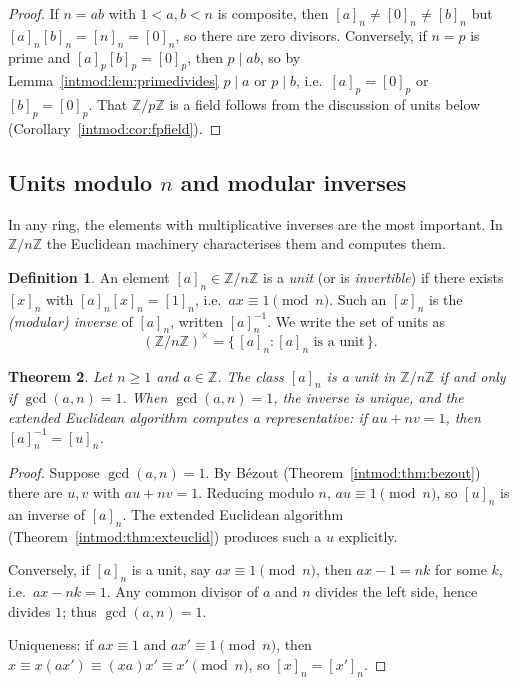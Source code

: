 \documentclass[11pt,a4paper]{article}
\newtheorem{theorem}{Theorem}[section]
\theoremstyle{definition}
\newtheorem{definition}[theorem]{Definition}
\theoremstyle{remark}
\newcommand{\Z}{\ensuremath{\mathbb{Z}}}
\begin{document}
\begin{proof}
If \(n=ab\) with \(1<a,b<n\) is composite, then \([a]_n\neq[0]_n\neq[b]_n\) but \([a]_n[b]_n=[n]_n=[0]_n\), so there are zero divisors. Conversely, if \(n=p\) is prime and \([a]_p[b]_p=[0]_p\), then \(p\mid ab\), so by Lemma~\ref{intmod:lem:primedivides} \(p\mid a\) or \(p\mid b\), i.e.\ \([a]_p=[0]_p\) or \([b]_p=[0]_p\). That \(\Z/p\Z\) is a field follows from the discussion of units below (Corollary~\ref{intmod:cor:fpfield}).
\end{proof}

\subsection{Units modulo \texorpdfstring{\(n\)}{n} and modular inverses}\label{intmod:sub:units}

In any ring, the elements with multiplicative inverses are the most important. In \(\Z/n\Z\) the Euclidean machinery characterises them and computes them.

\begin{definition}\label{intmod:def:unit}
An element \([a]_n\in\Z/n\Z\) is a \emph{unit} (or is \emph{invertible}) if there exists \([x]_n\) with \([a]_n[x]_n=[1]_n\), i.e.\ \(ax\equiv 1\pmod n\). Such an \([x]_n\) is the \emph{(modular) inverse} of \([a]_n\), written \([a]_n^{-1}\). We write the set of units as
\[
(\Z/n\Z)^\times = \{\, [a]_n : [a]_n \text{ is a unit} \,\}.
\]
\end{definition}

\begin{theorem}\label{intmod:thm:unitiff}
Let \(n\ge 1\) and \(a\in\Z\). The class \([a]_n\) is a unit in \(\Z/n\Z\) if and only if \(\gcd(a,n)=1\). When \(\gcd(a,n)=1\), the inverse is unique, and the extended Euclidean algorithm computes a representative: if \(au+nv=1\), then \([a]_n^{-1}=[u]_n\).
\end{theorem}

\begin{proof}
Suppose \(\gcd(a,n)=1\). By Bézout (Theorem~\ref{intmod:thm:bezout}) there are \(u,v\) with \(au+nv=1\). Reducing modulo \(n\), \(au\equiv 1\pmod n\), so \([u]_n\) is an inverse of \([a]_n\). The extended Euclidean algorithm (Theorem~\ref{intmod:thm:exteuclid}) produces such a \(u\) explicitly.

Conversely, if \([a]_n\) is a unit, say \(ax\equiv 1\pmod n\), then \(ax-1=nk\) for some \(k\), i.e.\ \(ax-nk=1\). Any common divisor of \(a\) and \(n\) divides the left side, hence divides \(1\); thus \(\gcd(a,n)=1\).

Uniqueness: if \(ax\equiv 1\) and \(ax'\equiv 1\pmod n\), then \(x\equiv x(ax')\equiv(xa)x'\equiv x'\pmod n\), so \([x]_n=[x']_n\).
\end{proof}
\end{document}
